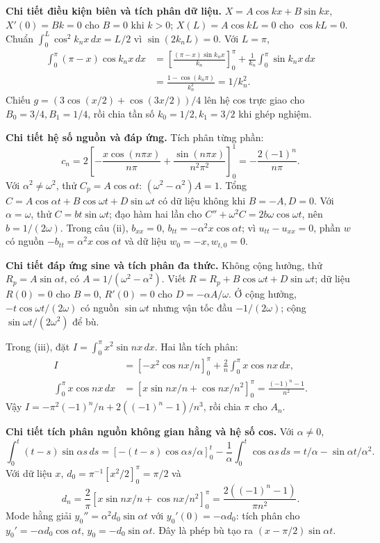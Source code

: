 \textbf{Chi tiết điều kiện biên và tích phân dữ liệu.} $X=A\cos kx+B\sin kx$, $X'(0)=Bk=0$ cho $B=0$ khi $k>0$; $X(L)=A\cos kL=0$ cho $\cos kL=0$. Chuẩn $\int_0^L\cos^2k_nx\,dx=L/2$ vì $\sin(2k_nL)=0$. Với $L=\pi$,
\[\begin{aligned}
\int_0^\pi(\pi-x)\cos k_nx\,dx
&=\left[\frac{(\pi-x)\sin k_nx}{k_n}\right]_0^\pi
+\frac1{k_n}\int_0^\pi\sin k_nx\,dx\\
&=\frac{1-\cos(k_n\pi)}{k_n^2}=1/k_n^2.
\end{aligned}\]
Chiếu $g=(3\cos(x/2)+\cos(3x/2))/4$ lên hệ cos trực giao cho $B_0=3/4,B_1=1/4$, rồi chia tần số $k_0=1/2,k_1=3/2$ khi ghép nghiệm.

\textbf{Chi tiết hệ số nguồn và đáp ứng.} Tích phân từng phần:
\[c_n=2\left[-\frac{x\cos(n\pi x)}{n\pi}+
\frac{\sin(n\pi x)}{n^2\pi^2}\right]_0^1
=-\frac{2(-1)^n}{n\pi}.\]
Với $\alpha^2\ne\omega^2$, thử $C_p=A\cos\alpha t$: $(\omega^2-\alpha^2)A=1$. Tổng $C=A\cos\alpha t+B\cos\omega t+D\sin\omega t$ có dữ liệu không khi $B=-A,D=0$. Với $\alpha=\omega$, thử $C=bt\sin\omega t$; đạo hàm hai lần cho $C''+\omega^2C=2b\omega\cos\omega t$, nên $b=1/(2\omega)$. Trong câu (ii), $b_{xx}=0$, $b_{tt}=-\alpha^2x\cos\alpha t$; vì $u_{tt}-u_{xx}=0$, phần $w$ có nguồn $-b_{tt}=\alpha^2x\cos\alpha t$ và dữ liệu $w_0=-x,w_{t,0}=0$.

\textbf{Chi tiết đáp ứng sine và tích phân đa thức.} Không cộng hưởng, thử $R_p=A\sin\alpha t$, có $A=1/(\omega^2-\alpha^2)$. Viết $R=R_p+B\cos\omega t+D\sin\omega t$; dữ liệu $R(0)=0$ cho $B=0$, $R'(0)=0$ cho $D=-\alpha A/\omega$. Ở cộng hưởng, $-t\cos\omega t/(2\omega)$ có nguồn $\sin\omega t$ nhưng vận tốc đầu $-1/(2\omega)$; cộng $\sin\omega t/(2\omega^2)$ để bù.

Trong (iii), đặt $I=\int_0^\pi x^2\sin nx\,dx$. Hai lần tích phân:
\[\begin{aligned}
I&=\left[-x^2\cos nx/n\right]_0^\pi+\frac2n\int_0^\pi x\cos nx\,dx,\\
\int_0^\pi x\cos nx\,dx
&=\left[x\sin nx/n+\cos nx/n^2\right]_0^\pi
=\frac{(-1)^n-1}{n^2}.
\end{aligned}\]
Vậy $I=-\pi^2(-1)^n/n+2((-1)^n-1)/n^3$, rồi chia $\pi$ cho $A_n$.

\textbf{Chi tiết tích phân nguồn không gian hằng và hệ số cos.} Với $\alpha\ne0$,
\[\int_0^t(t-s)\sin\alpha s\,ds
=\left[-(t-s)\cos\alpha s/\alpha\right]_0^t-\frac1\alpha\int_0^t\cos\alpha s\,ds
=t/\alpha-\sin\alpha t/\alpha^2.\]
Với dữ liệu $x$, $d_0=\pi^{-1}[x^2/2]_0^\pi=\pi/2$ và
\[d_n=\frac2\pi\left[x\sin nx/n+\cos nx/n^2\right]_0^\pi
=\frac{2((-1)^n-1)}{\pi n^2}.\]
Mode hằng giải $y_0''=\alpha^2d_0\sin\alpha t$ với $y_0'(0)=-\alpha d_0$: tích phân cho $y_0'=-\alpha d_0\cos\alpha t$, $y_0=-d_0\sin\alpha t$. Đây là phép bù tạo ra $(x-\pi/2)\sin\alpha t$.

